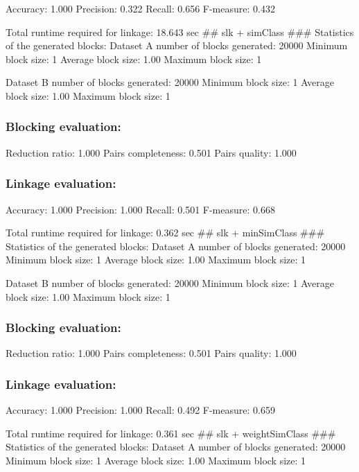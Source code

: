 \documentclass[
  letterpaper,
  DIV=11,
  numbers=noendperiod]{scrartcl}
\begin{document}
Accuracy: 1.000 Precision: 0.322 Recall: 0.656 F-measure: 0.432

Total runtime required for linkage: 18.643 sec \#\# slk + simClass
\#\#\# Statistics of the generated blocks: Dataset A number of blocks
generated: 20000 Minimum block size: 1 Average block size: 1.00 Maximum
block size: 1

Dataset B number of blocks generated: 20000 Minimum block size: 1
Average block size: 1.00 Maximum block size: 1

\hypertarget{blocking-evaluation-6}{%
\subsubsection{Blocking evaluation:}\label{blocking-evaluation-6}}

Reduction ratio: 1.000 Pairs completeness: 0.501 Pairs quality: 1.000

\hypertarget{linkage-evaluation-6}{%
\subsubsection{Linkage evaluation:}\label{linkage-evaluation-6}}

Accuracy: 1.000 Precision: 1.000 Recall: 0.501 F-measure: 0.668

Total runtime required for linkage: 0.362 sec \#\# slk + minSimClass
\#\#\# Statistics of the generated blocks: Dataset A number of blocks
generated: 20000 Minimum block size: 1 Average block size: 1.00 Maximum
block size: 1

Dataset B number of blocks generated: 20000 Minimum block size: 1
Average block size: 1.00 Maximum block size: 1

\hypertarget{blocking-evaluation-7}{%
\subsubsection{Blocking evaluation:}\label{blocking-evaluation-7}}

Reduction ratio: 1.000 Pairs completeness: 0.501 Pairs quality: 1.000

\hypertarget{linkage-evaluation-7}{%
\subsubsection{Linkage evaluation:}\label{linkage-evaluation-7}}

Accuracy: 1.000 Precision: 1.000 Recall: 0.492 F-measure: 0.659

Total runtime required for linkage: 0.361 sec \#\# slk + weightSimClass
\#\#\# Statistics of the generated blocks: Dataset A number of blocks
generated: 20000 Minimum block size: 1 Average block size: 1.00 Maximum
block size: 1
\end{document}
